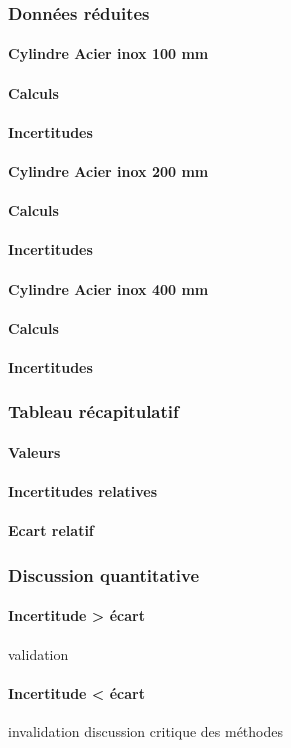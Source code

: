 \newpage

\subsubsection{\large Données réduites}
\paragraph{\large Cylindre Acier inox 100 mm}
\paragraph{Calculs}
\paragraph{Incertitudes}

\paragraph{\large Cylindre Acier inox 200 mm}
\paragraph{Calculs}
\paragraph{Incertitudes}

\paragraph{\large Cylindre Acier inox 400 mm}
\paragraph{Calculs}
\paragraph{Incertitudes}

\newpage

\subsubsection{\large Tableau récapitulatif}
\paragraph{Valeurs}
\paragraph{Incertitudes relatives}
\paragraph{Ecart relatif}

\subsubsection{\large Discussion quantitative}
\paragraph{Incertitude > écart}
validation
\paragraph{Incertitude < écart}
invalidation
discussion critique des méthodes